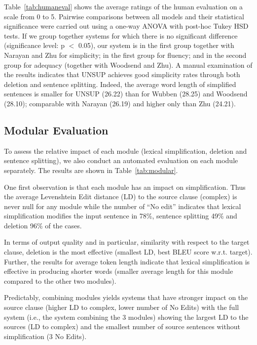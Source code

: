 \documentclass[11pt,a4paper]{article}
\begin{document}
Table~\ref{tab:humaneval} shows the average ratings of the human
evaluation on a scale from 0 to 5. Pairwise comparisons between all
models and their statistical significance were carried out using a
one-way ANOVA with post-hoc Tukey HSD tests. If we group together
systems for which there is no significant difference (significance
level: p $<$ 0.05), our system is in the first group together with
Narayan and Zhu for simplicity; in the first group for fluency; and in
the second group for adequacy (together with Woodsend and Zhu).  A
manual examination of the results indicates that UNSUP achieves good
simplicity rates through both deletion and sentence splitting. Indeed,
the average word length of simplified sentences is smaller for UNSUP
(26.22) than for Wubben (28.25) and Woodsend (28.10); comparable with
Narayan (26.19) and higher only than Zhu (24.21).

\vspace{-0.05cm}
\subsection{Modular Evaluation}

To assess the relative impact of each module (lexical simplification,
deletion and sentence splitting), we also conduct an automated
evaluation on each module separately. The results are shown in
Table~\ref{tab:modular}.

One first observation is that each module has an impact on
simplification. Thus the average Levenshtein Edit distance (LD) to
the source clause (complex) is never null for any module while the
number of ``No edit'' indicates that lexical simplification modifies
the input sentence in 78\%, sentence splitting 49\% and deletion 96\%
of the cases.  

In terms of output quality and in particular, similarity with respect
to the target clause, deletion is the most effective (smallest LD,
best BLEU score w.r.t. target). Further, the results for average
token length indicate that lexical simplification is effective in
producing shorter words (smaller average length for this
module compared to the other two modules).

Predictably, combining modules yields systems that have stronger
impact on the source clause (higher LD to complex, lower number of No
Edits) with the full system (i.e., the system combining the 3
modules) showing the largest LD to the sources (LD to complex) and the
smallest number of source sentences without simplification (3 No
Edits). 
\end{document}
